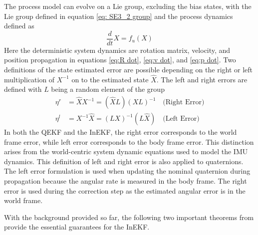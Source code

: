 The process model can evolve on a Lie group, excluding the bias states, with the Lie group defined in equation \eqref{eq: SE3_2 group} and the process dynamics defined as \cite{Contact-Aided_Invarant_EKF}
\begin{equation}
    \frac{d}{dt} X = f_{u}(X)
    \label{eq: X diff process model}
\end{equation}
Here the deterministic system dynamics are rotation matrix, velocity, and position propagation in equations \eqref{eq:R dot}, \eqref{eq:v dot}, and \eqref{eq:p dot}. Two definitions of the state estimated error are possible depending on the right or left multiplication of $X^{-1}$ on to the estimated state $\hat{X}$. The left and right errors are defined with $L$ being a random element of the group \cite{Contact-Aided_Invarant_EKF}
\begin{subequations}
    \begin{align}
        \eta^r &= \hat{X} X^{-1} = (\hat{X} L) (X L)^{-1} \quad \text{(Right Error)}\\
        \eta^l &= X^{-1} \hat{X} =  (L X)^{-1} (L \hat{X}) \quad \text{(Left Error)}
        \label{eq: left and right errors}
    \end{align}
\end{subequations}
In both the QEKF and the InEKF, the right error corresponds to the world frame error, while left error corresponds to the body frame error. This distinction arises from the world-centric system dynamic equations used to model the IMU dynamics. This definition of left and right error is also applied to quaternions. The left error formulation is used when updating the nominal quaternion during propagation because the angular rate is measured in the body frame. The right error is used during the correction step as the estimated angular error is in the world frame. 

With the background provided so far, the following two important theorems from \cite{DBLP:journals/corr/BarrauB14} provide the essential guarantees for the InEKF.


